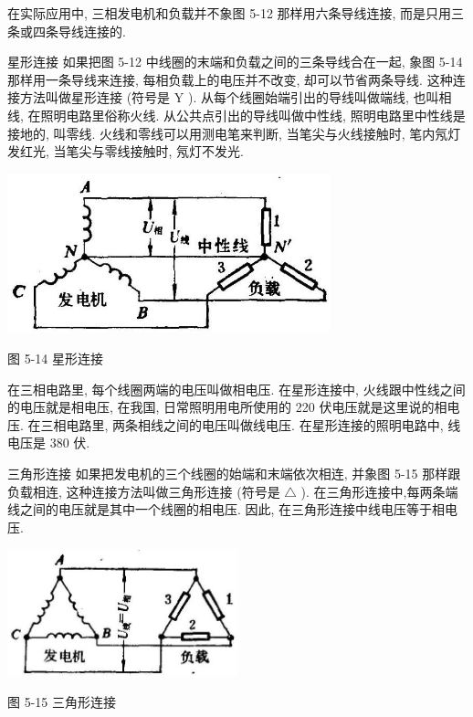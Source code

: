 \documentclass[10pt]{article}
\begin{document}
在实际应用中, 三相发电机和负载并不象图 5-12 那样用六条导线连接, 而是只用三条或四条导线连接的.

星形连接 如果把图 5-12 中线圈的末端和负载之间的三条导线合在一起, 象图 5-14 那样用一条导线来连接, 每相负载上的电压并不改变, 却可以节省两条导线. 这种连接方法叫做星形连接 (符号是 \(\mathrm{Y}\) ). 从每个线圈始端引出的导线叫做端线, 也叫相线, 在照明电路里俗称火线. 从公共点引出的导线叫做中性线, 照明电路里中性线是接地的, 叫零线. 火线和零线可以用测电笔来判断, 当笔尖与火线接触时, 笔内氖灯发红光, 当笔尖与零线接触时, 氖灯不发光.

\begin{center}
\includegraphics[max width=0.7\textwidth]{images/01913056-1f15-74d8-9184-9aab52c9d66b_175_197180.jpg}
\end{center}

图 5-14 星形连接

在三相电路里, 每个线圈两端的电压叫做相电压. 在星形连接中, 火线跟中性线之间的电压就是相电压, 在我国, 日常照明用电所使用的 220 伏电压就是这里说的相电压. 在三相电路里, 两条相线之间的电压叫做线电压. 在星形连接的照明电路中, 线电压是 380 伏.

三角形连接 如果把发电机的三个线圈的始端和末端依次相连, 并象图 5-15 那样跟负载相连, 这种连接方法叫做三角形连接 (符号是 \(\bigtriangleup\) ). 在三角形连接中,每两条端线之间的电压就是其中一个线圈的相电压. 因此, 在三角形连接中线电压等于相电压.

\begin{center}
\includegraphics[max width=0.5\textwidth]{images/01913056-1f15-74d8-9184-9aab52c9d66b_176_647360.jpg}
\end{center}

图 5-15 三角形连接
\end{document}
